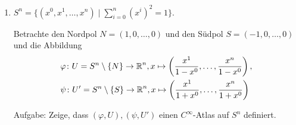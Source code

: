 \begin{bsp}
\begin{enumerate}
  \item $S^n = \{(x^0, x^1, \ldots, x^n) \mid \sum_{i = 0}^n(x^{i})^2 = 1\}$.\\


    Betrachte den Nordpol $N = (1,0,\ldots,0)$ und den Südpol $S = (-1,0,\ldots,0)$ und die Abbildung
    \begin{align*}
      & \varphi \colon U = S^{n}\setminus\{N\} \to \operatorname{\mathbb{R}}^n, x \mapsto \left(\frac{x^1}{1-x^0}, \ldots, \frac{x^{n}}{1-x^0}\right),\\
      & \psi \colon U' = S^{n} \setminus \{S\} \to \operatorname{\mathbb{R}}^n, x \mapsto \left(\frac{x^1}{1+x^0}, \ldots, \frac{x^n}{1+x^0}\right)
    \end{align*}

    Aufgabe: Zeige, dass $(\varphi, U), (\psi, U')$ einen $C^{\infty}$-Atlas auf $S^n$ definiert.

  \end{enumerate}
\end{bsp}

